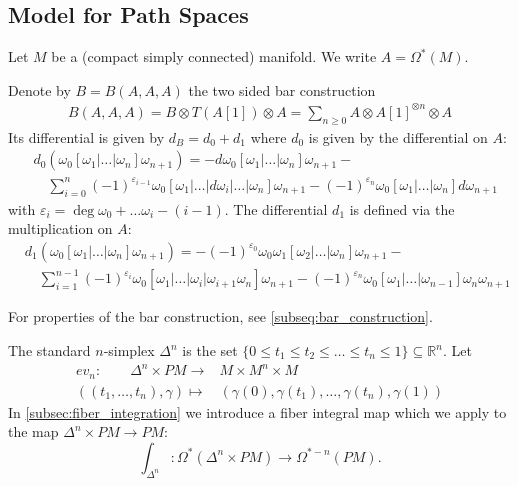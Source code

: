 \documentclass{scrartcl}
\theoremstyle{plain}
\theoremstyle{definition}
\newcommand{\R}{\mathbb R}
\renewcommand{\subset}{\subseteq}
\begin{document}
\subsection{Model for Path Spaces}

Let $M$ be a (compact simply connected) manifold. We write $A=\Omega^*(M)$. 

Denote by $B = B(A, A, A)$ the two sided bar construction
\begin{align*}
    B(A, A, A) = B\otimes T(A[1]) \otimes A = \sum_{n\geq 0} A\otimes A[1]^{\otimes n} \otimes A
\end{align*}
Its differential is given by $d_B = d_0 + d_1$ where $d_0$ is given by the differential on $A$:
\begin{align*}
    &d_0(\omega_0[\omega_1|\dots|\omega_n]\omega_{n+1}) = - d\omega_0[\omega_1|\dots|\omega_n]\omega_{n+1} - \\
    &\quad \sum_{i=0}^n (-1)^{\varepsilon_{i-1}} \omega_0[\omega_1|\dots|d\omega_i|\dots|\omega_n]\omega_{n+1} - (-1)^{\varepsilon_{n}} \omega_0[\omega_1|\dots|\omega_n]d\omega_{n+1}
\end{align*}
with $\varepsilon_i = \deg\omega_0+\dots\omega_i - (i-1)$. The differential $d_1$ is defined via the multiplication on $A$:
\begin{align*}
    &d_1(\omega_0[\omega_1|\dots|\omega_n]\omega_{n+1}) = -(-1)^{\varepsilon_0}\omega_0\omega_1[\omega_2|\dots|\omega_n]\omega_{n+1} - \\&\quad\sum_{i=1}^{n-1} (-1)^{\varepsilon_i}\omega_0[\omega_1|\dots|\omega_i|\omega_{i+1}\omega_n]\omega_{n+1} - (-1)^{\varepsilon_{n}}\omega_0[\omega_1|\dots|\omega_{n-1}]\omega_{n}\omega_{n+1}
\end{align*}

For properties of the bar construction, see \ref{subseq:bar_construction}. 

The standard $n$-simplex $\Delta^n$ is the set $\{0\leq t_1\leq t_2\leq \dots\leq t_n\leq 1\} \subset \R^n$. Let 
\begin{align*}
    ev_n\colon\qquad\Delta^n\times PM \to & M\times M^n\times M \\
    ((t_1,\dots, t_n), \gamma)\mapsto &(\gamma(0), \gamma(t_1), \dots, \gamma(t_n), \gamma(1))
\end{align*}
In \ref{subsec:fiber_integration} we introduce a fiber integral map which we apply to the map $\Delta^n\times PM \to PM$: 
$$\int_{\Delta^n}\colon \Omega^*(\Delta^n\times PM) \to \Omega^{*-n}(PM).$$
\end{document}
